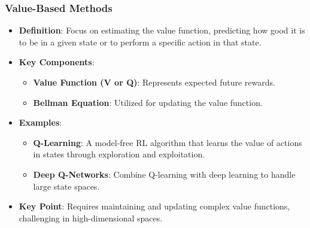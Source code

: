 \documentclass[aspectratio=169]{beamer}
\begin{document}
\begin{frame}[fragile]
    \frametitle{Value-Based Methods}
    \begin{itemize}
        \item \textbf{Definition}: Focus on estimating the value function, predicting how good it is to be in a given state or to perform a specific action in that state.
        \item \textbf{Key Components}:
            \begin{itemize}
                \item \textbf{Value Function (V or Q)}: Represents expected future rewards. 
                \item \textbf{Bellman Equation}: Utilized for updating the value function.
            \end{itemize}
        \item \textbf{Examples}:
            \begin{itemize}
                \item \textbf{Q-Learning}: A model-free RL algorithm that learns the value of actions in states through exploration and exploitation.
                \item \textbf{Deep Q-Networks}: Combine Q-learning with deep learning to handle large state spaces.
            \end{itemize}
        \item \textbf{Key Point}: Requires maintaining and updating complex value functions, challenging in high-dimensional spaces.
    \end{itemize}
\end{frame}
\end{document}
